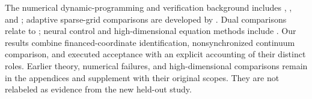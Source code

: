 The numerical dynamic-programming and verification background includes \citet{Judd1998}, \citet{KushnerDupuis2001}, and \citet{BarlesSouganidis1991}; adaptive sparse-grid comparisons are developed by \citet{BrummScheidegger2017}. Dual comparisons relate to \citet{BrownSmithSun2010,BrownSmith2011}; neural control and high-dimensional equation methods include \citet{HanE2016,HanJentzenE2018}. Our results combine financed-coordinate identification, nonsynchronized continuum comparison, and executed acceptance with an explicit accounting of their distinct roles. Earlier theory, numerical failures, and high-dimensional comparisons remain in the appendices and supplement with their original scopes. They are not relabeled as evidence from the new held-out study.
